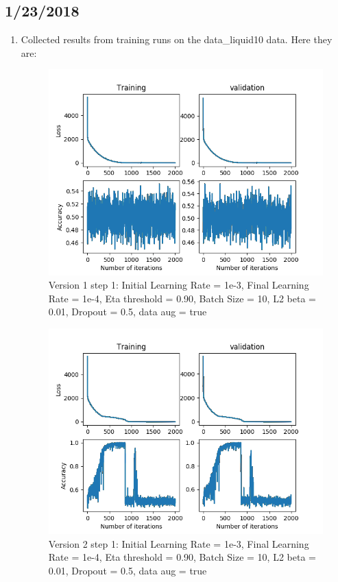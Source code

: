 \documentclass[12pt,reqno]{amsart}
\numberwithin{equation}{section}
\begin{document}
\subsection{1/23/2018}
\begin{enumerate}
\item Collected results from training runs on the data\_liquid10 data.  Here they are:

\begin{figure}[H]
\centering
\includegraphics[scale=0.6]{data_liquid10_version1_step1}
\caption{Version 1 step 1: Initial Learning Rate = 1e-3, Final Learning Rate = 1e-4, Eta threshold = 0.90, Batch Size = 10, L2 beta = 0.01, Dropout = 0.5, data aug = true}
\end{figure}

\begin{figure}[H]
\centering
\includegraphics[scale=0.6]{data_liquid10_version2_step1}
\caption{Version 2 step 1: Initial Learning Rate = 1e-3, Final Learning Rate = 1e-4, Eta threshold = 0.90, Batch Size = 10, L2 beta = 0.01, Dropout = 0.5, data aug = true}
\end{figure}


\end{enumerate}
\end{document}

